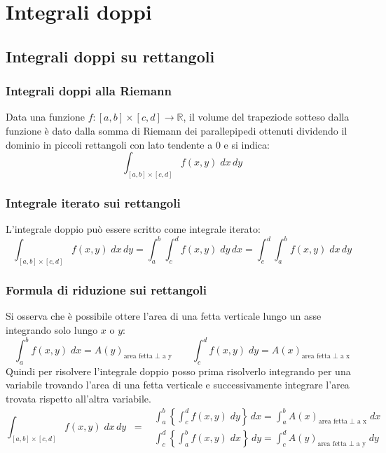 \documentclass[a4paper]{article}
\newcommand\R{\mathbb{R}}     %
\begin{document}
\newpage


\section{Integrali doppi}
\subsection{Integrali doppi su rettangoli}
\subsubsection*{Integrali doppi alla Riemann}
Data una funzione \(f:[a,b] \times [c,d] \to \R\), il volume del trapeziode sotteso dalla funzione è dato dalla somma di Riemann
dei parallepipedi ottenuti dividendo il dominio in piccoli rettangoli con lato tendente a 0 e si indica:
\[\int_{[a,b] \times [c,d]} f(x,y) \; dx \, dy\]

\subsubsection*{Integrale iterato sui rettangoli}
L'integrale doppio può essere scritto come integrale iterato:
\[\int_{[a,b] \times [c,d]} f(x,y) \; dx \, dy = \int_{a}^{b} \int_{c}^{d} f(x,y) \; dy \, dx = \int_{c}^{d} \int_{a}^{b} f(x,y) \; dx \, dy\]

\subsubsection*{Formula di riduzione sui rettangoli}
Si osserva che è possibile ottere l'area di una fetta verticale lungo un asse integrando solo lungo \(x\) o \(y\):
\[\int_{a}^{b} f(x,y) \; dx = {A(y)}_\text{area fetta \(\perp\) a y} \qquad \int_{c}^{d} f(x,y) \; dy = {A(x)}_\text{area fetta \(\perp\) a x}\]
Quindi per risolvere l'integrale doppio posso prima risolverlo integrando per una variabile trovando l'area di una fetta verticale
e successivamente integrare l'area trovata rispetto all'altra variabile.
\[\int_{[a,b] \times [c,d]} f(x,y) \; dx \, dy \;\; = \;\; \begin{matrix}
	\displaystyle \int_{a}^{b} \left\{ \int_{c}^{d} f(x,y) \; dy \right\} \, dx = \int_{a}^{b} {A(x)}_\text{area fetta \(\perp\) a x} \; dx \\[15pt]
	\displaystyle \int_{c}^{d} \left\{ \int_{a}^{b} f(x,y) \; dx \right\} \, dy = \int_{c}^{d} {A(y)}_\text{area fetta \(\perp\) a y} \; dy
\end{matrix}\]
\end{document}

